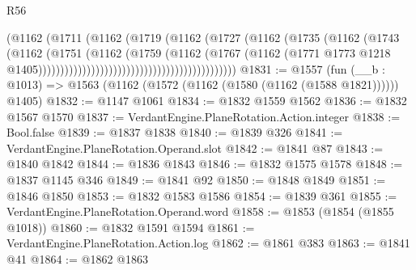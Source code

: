 \begin{lexlean}{R56}
\begin{coremodule}
                                                          (@1162
                                                            (@1711
                                                              (@1162
                                                                (@1719
                                                                  (@1162
                                                                    (@1727
                                                                      (@1162
                                                                        (@1735
                                                                          (@1162
                                                                            (@1743
                                                                              (@1162
                                                                                (@1751
                                                                                  (@1162
                                                                                    (@1759
                                                                                      (@1162
                                                                                        (@1767
                                                                                          (@1162
                                                                                            (@1771
                                                                                              @1773
                                                                                              @1218
                                                                                              @1405)))))))))))))))))))))))))))))))))))))))))))))
@1831 := @1557
    (fun (__b : @1013) => @1563 (@1162 (@1572 (@1162 (@1580 (@1162 (@1588 @1821)))))) @1405)
@1832 := @1147 @1061
@1834 := @1832 @1559 @1562
@1836 := @1832 @1567 @1570
@1837 := VerdantEngine.PlaneRotation.Action.integer
@1838 := Bool.false
@1839 := @1837 @1838
@1840 := @1839 @326
@1841 := VerdantEngine.PlaneRotation.Operand.slot
@1842 := @1841 @87
@1843 := @1840 @1842
@1844 := @1836 @1843
@1846 := @1832 @1575 @1578
@1848 := @1837 @1145 @346
@1849 := @1841 @92
@1850 := @1848 @1849
@1851 := @1846 @1850
@1853 := @1832 @1583 @1586
@1854 := @1839 @361
@1855 := VerdantEngine.PlaneRotation.Operand.word
@1858 := @1853 (@1854 (@1855 @1018))
@1860 := @1832 @1591 @1594
@1861 := VerdantEngine.PlaneRotation.Action.log
@1862 := @1861 @383
@1863 := @1841 @41
@1864 := @1862 @1863

\end{coremodule}
\end{lexlean}
